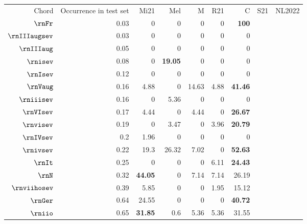 \begin{table}[]
    \begin{tabular}{rrrrrrr}
    Chord & Occurrence in test set & Mi21           & Mel            & M&R21 & C&S21 & NL2022         \\
    $\rnFr$   & 0.03                   & 0              & 0              & 0     & 0     & \textbf{100}   \\
    $\rnIIIaugsev$ & 0.03                   & 0              & 0              & 0     & 0     & 0              \\
    $\rnIIIaug$  & 0.05                   & 0              & 0              & 0     & 0     & 0              \\
    $\rnisev$    & 0.08                   & 0              & \textbf{19.05} & 0     & 0     & 0              \\
    $\rnIsev$    & 0.12                   & 0              & 0              & 0     & 0     & 0              \\
    $\rnVaug$    & 0.16                   & 4.88           & 0              & 14.63 & 4.88  & \textbf{41.46} \\
    $\rniiisev$  & 0.16                   & 0              & 5.36           & 0     & 0     & 0              \\
    $\rnVIsev$   & 0.17                   & 4.44           & 0              & 4.44  & 0     & \textbf{26.67} \\
    $\rnvisev$   & 0.19                   & 0              & 3.47           & 0     & 3.96  & \textbf{20.79} \\
    $\rnIVsev$   & 0.2                    & 1.96           & 0              & 0     & 0     & 0              \\
    $\rnivsev$   & 0.22                   & 19.3           & 26.32          & 7.02  & 0     & \textbf{52.63} \\
    $\rnIt$    & 0.25                   & 0              & 0              & 0     & 6.11  & \textbf{24.43} \\
    $\rnN$     & 0.32                   & \textbf{44.05} & 0              & 7.14  & 7.14  & 26.19          \\
    $\rnviihosev$ & 0.39                   & 5.85           & 0              & 0     & 1.95  & 15.12          \\
    $\rnGer$  & 0.64                   & 24.55          & 0              & 0     & 0     & \textbf{40.72} \\
    $\rniio$   & 0.65                   & \textbf{31.85} & 0.6            & 5.36  & 5.36  & 31.55          \\

\end{tabular}
\end{table}
